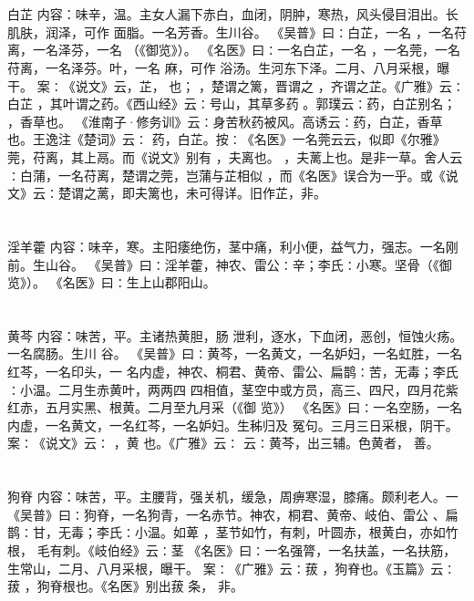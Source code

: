 \documentclass[12pt,UTF8]{ctexbook}
\begin{document}
\section{}白芷
内容：味辛，温。主女人漏下赤白，血闭，阴肿，寒热，风头侵目泪出。长肌肤，润泽，可作 
面脂。一名芳香。生川谷。 
《吴普》曰∶白芷，一名 ，一名苻离，一名泽芬，一名 （《御览》）。 
《名医》曰∶一名白芷，一名 ，一名莞，一名苻离，一名泽芬。叶，一名 麻，可作 
浴汤。生河东下泽。二月、八月采根，曝干。 
案∶《说文》云，芷， 也； ，楚谓之篱，晋谓之 ，齐谓之芷。《广雅》云∶白芷 
，其叶谓之药。《西山经》云∶号山，其草多药 。郭璞云∶药，白芷别名； ，香草也。 
《淮南子·修务训》云∶身苦秋药被风。高诱云∶药，白芷，香草也。王逸注《楚词》云∶ 
药，白芷。按∶《名医》一名莞云云，似即《尔雅》莞，苻离，其上鬲。而《说文》别有 
，夫离也。 ，夫蓠上也。是非一草。舍人云∶白蒲，一名苻离，楚谓之莞，岂蒲与芷相似 
，而《名医》误合为一乎。或《说文》云∶楚谓之蓠，即夫篱也，未可得详。旧作芷，非。 


\section{}淫羊藿
内容：味辛，寒。主阳痿绝伤，茎中痛，利小便，益气力，强志。一名刚前。生山谷。 
《吴普》曰∶淫羊藿，神农、雷公∶辛；李氏∶小寒。坚骨（《御览》）。 
《名医》曰∶生上山郡阳山。 


\section{}黄芩
内容：味苦，平。主诸热黄胆，肠 泄利，逐水，下血闭，恶创，恒蚀火疡。一名腐肠。生川 
谷。 
《吴普》曰∶黄芩，一名黄文，一名妒妇，一名虹胜，一名红芩，一名印头，一 
名内虚，神农、桐君、黄帝、雷公、扁鹊∶苦，无毒；李氏∶小温。二月生赤黄叶，两两四 
四相值，茎空中或方员，高三、四尺，四月花紫红赤，五月实黑、根黄。二月至九月采（《御 
览》） 
《名医》曰∶一名空肠，一名内虚，一名黄文，一名红芩，一名妒妇。生秭归及 
冤句。三月三日采根，阴干。 
案∶《说文》云∶ ，黄 也。《广雅》云∶ 
云∶黄芩，出三辅。色黄者， 
善。 


\section{}狗脊
内容：味苦，平。主腰背，强关机，缓急，周痹寒湿，膝痛。颇利老人。一 
《吴普》曰∶狗脊，一名狗青，一名赤节。神农，桐君、黄帝、岐伯、雷公 
、扁鹊∶甘，无毒；李氏∶小温。如萆 ，茎节如竹，有刺，叶圆赤，根黄白，亦如竹根， 
毛有刺。《岐伯经》云∶茎 
《名医》曰∶一名强膂，一名扶盖，一名扶筋，生常山，二月、八月采根，曝干。 
案∶《广雅》云∶菝 ，狗脊也。《玉篇》云∶菝 ，狗脊根也。《名医》别出菝 条， 
非。 
\end{document}
